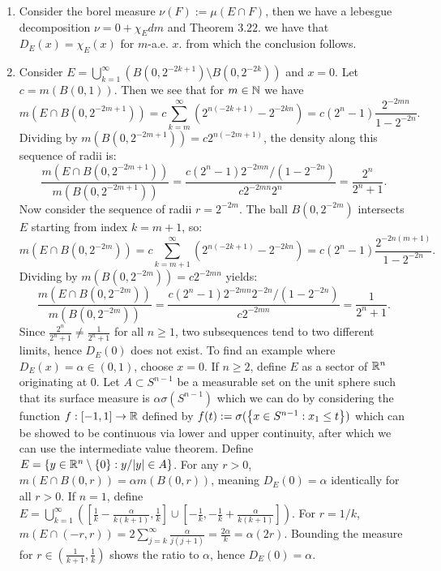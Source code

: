 \documentclass[12pt,a4paper]{article}
\begin{document}
\begin{solution}
\begin{enumerate}[label=\alph*.]
\item Consider the borel measure $\nu(F):=\mu(E\cap F)$, then we have a lebesgue decomposition $\nu=0+\chi_Edm$ and Theorem $3.22.$ we have that $D_E(x)=\chi_E(x)$ for $m$-a.e. $x.$ from which the conclusion follows.
\item Consider $E=\bigcup_{k=1}^{\infty}(B(0,2^{-2k+1})\setminus B(0,2^{-2k}))$ and $x=0$. Let $c = m(B(0,1))$. Then we see that for $m\in\mathbb{N}$ we have 
    \[ m(E\cap B(0,2^{-2m+1})) = c\sum_{k=m}^{\infty}\left(2^{n(-2k+1)}-2^{-2kn}\right) = c(2^n-1)\frac{2^{-2mn}}{1-2^{-2n}}. \]
    Dividing by $m(B(0, 2^{-2m+1})) = c 2^{n(-2m+1)}$, the density along this sequence of radii is:
    \[ \frac{m(E\cap B(0,2^{-2m+1}))}{m(B(0,2^{-2m+1}))} = \frac{c(2^n-1)2^{-2mn}/(1-2^{-2n})}{c 2^{-2mn} 2^n} = \frac{2^n}{2^n+1}. \]
    Now consider the sequence of radii $r = 2^{-2m}$. The ball $B(0, 2^{-2m})$ intersects $E$ starting from index $k=m+1$, so:
    \[ m(E\cap B(0,2^{-2m})) = c\sum_{k=m+1}^{\infty}\left(2^{n(-2k+1)}-2^{-2kn}\right) = c(2^n-1)\frac{2^{-2n(m+1)}}{1-2^{-2n}}. \]
    Dividing by $m(B(0, 2^{-2m})) = c 2^{-2mn}$ yields:
    \[ \frac{m(E\cap B(0,2^{-2m}))}{m(B(0,2^{-2m}))} = \frac{c(2^n-1)2^{-2mn}2^{-2n}/(1-2^{-2n})}{c 2^{-2mn}} = \frac{1}{2^n+1}. \]
    Since $\frac{2^n}{2^n+1}\neq\frac{1}{2^n+1}$ for all $n \geq 1$, two subsequences tend to two different limits, hence $D_E(0)$ does not exist. 
    To find an example where $D_E(x) = \alpha \in (0,1)$, choose $x=0$. 
	If $n \geq 2$, define $E$ as a sector of $\mathbb{R}^n$ originating at $0$. Let $A \subset S^{n-1}$ be a measurable set on the unit sphere such that its surface measure is $\alpha \sigma(S^{n-1})$ which we can do by considering the function $f:[-1,1]\to\mathbb{R}$ defined by $f(t):=\sigma( \qty{x\in S^{n-1}:x_1\leq t})$ which can be showed to be continuous via lower and upper continuity, after which we can use the intermediate value theorem. Define $E = \{ y \in \mathbb{R}^n \setminus \{0\} : y/|y| \in A \}$. For any $r > 0$, $m(E \cap B(0,r)) = \alpha m(B(0,r))$, meaning $D_E(0) = \alpha$ identically for all $r>0$.
    If $n = 1$, define $E = \bigcup_{k=1}^\infty \left( \left[ \frac{1}{k} - \frac{\alpha}{k(k+1)}, \frac{1}{k} \right] \cup \left[ -\frac{1}{k}, -\frac{1}{k} + \frac{\alpha}{k(k+1)} \right] \right)$. For $r = 1/k$, $m(E \cap (-r, r)) = 2 \sum_{j=k}^\infty \frac{\alpha}{j(j+1)} = \frac{2\alpha}{k} = \alpha (2r)$. Bounding the measure for $r \in (\frac{1}{k+1}, \frac{1}{k})$ shows the ratio to $\alpha$, hence $D_E(0) = \alpha$. 
\end{enumerate}
\end{solution}
\end{document}

